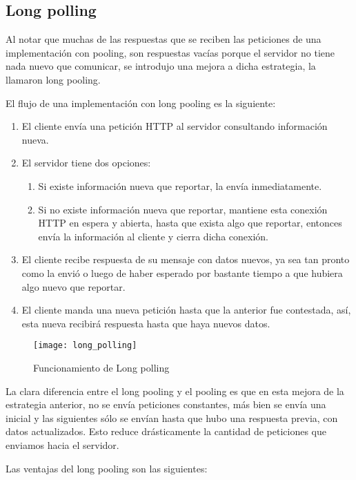 \subsection{Long polling}

Al notar que muchas de las respuestas que se reciben las peticiones de una implementación con pooling, son respuestas vacías porque el servidor no tiene nada nuevo que comunicar, se introdujo una mejora a dicha estrategia, la llamaron long pooling.

El flujo de una implementación con long pooling es la siguiente:

\begin{enumerate}
  \item El cliente envía una petición HTTP al servidor consultando información nueva.
  \item El servidor tiene dos opciones:
  \begin{enumerate}
    \item Si existe información nueva que reportar, la envía inmediatamente.
    \item Si no existe información nueva que reportar, mantiene esta conexión HTTP en espera y abierta, hasta que exista algo que reportar, entonces envía la información al cliente y cierra dicha conexión.
  \end{enumerate}
  \item El cliente recibe respuesta de su mensaje con datos nuevos, ya sea tan pronto como la envió o luego de haber esperado por bastante tiempo a que hubiera algo nuevo que reportar.
  \item El cliente manda una nueva petición hasta que la anterior fue contestada, así, esta nueva recibirá respuesta hasta que haya nuevos datos.
\end{enumerate}

\begin{figure}[htp!]
  \centering
  \texttt{[image: long\_polling]}
  \caption{Funcionamiento de Long polling}
  \label{fig:long_polling}
\end{figure}

La clara diferencia entre el long pooling y el pooling es que en esta mejora de la estrategia anterior, no se envía peticiones constantes, más bien se envía una inicial y las siguientes sólo se envían hasta que hubo una respuesta previa, con datos actualizados. Esto reduce drásticamente la cantidad de peticiones que enviamos hacia el servidor.

Las ventajas del long pooling son las siguientes:


